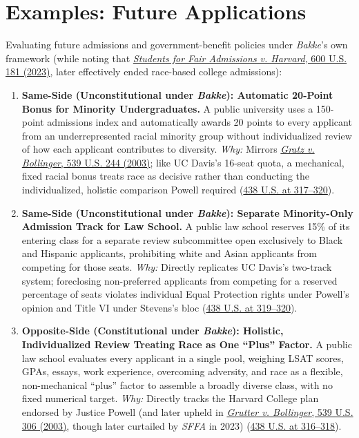 \documentclass[12pt]{article}
\begin{document}
\section{Examples: Future Applications}
Evaluating future admissions and government-benefit policies under \textit{Bakke}'s own framework (while noting that \href{https://en.wikipedia.org/wiki/Students_for_Fair_Admissions_v._Harvard}{\textit{Students for Fair Admissions v. Harvard}, 600 U.S. 181 (2023)}, later effectively ended race-based college admissions):

\begin{enumerate}
\item \textbf{Same-Side (Unconstitutional under \textit{Bakke}): Automatic 20-Point Bonus for Minority Undergraduates.} A public university uses a 150-point admissions index and automatically awards 20 points to every applicant from an underrepresented racial minority group without individualized review of how each applicant contributes to diversity. \textit{Why:} Mirrors \href{https://supreme.justia.com/cases/federal/us/539/244/}{\textit{Gratz v. Bollinger}, 539 U.S. 244 (2003)}; like UC Davis's 16-seat quota, a mechanical, fixed racial bonus treats race as decisive rather than conducting the individualized, holistic comparison Powell required (\href{https://supreme.justia.com/cases/federal/us/438/265/}{438 U.S. at 317--320}).

\item \textbf{Same-Side (Unconstitutional under \textit{Bakke}): Separate Minority-Only Admission Track for Law School.} A public law school reserves 15\% of its entering class for a separate review subcommittee open exclusively to Black and Hispanic applicants, prohibiting white and Asian applicants from competing for those seats. \textit{Why:} Directly replicates UC Davis's two-track system; foreclosing non-preferred applicants from competing for a reserved percentage of seats violates individual Equal Protection rights under Powell's opinion and Title VI under Stevens's bloc (\href{https://supreme.justia.com/cases/federal/us/438/265/}{438 U.S. at 319--320}).

\item \textbf{Opposite-Side (Constitutional under \textit{Bakke}): Holistic, Individualized Review Treating Race as One ``Plus'' Factor.} A public law school evaluates every applicant in a single pool, weighing LSAT scores, GPAs, essays, work experience, overcoming adversity, and race as a flexible, non-mechanical ``plus'' factor to assemble a broadly diverse class, with no fixed numerical target. \textit{Why:} Directly tracks the Harvard College plan endorsed by Justice Powell (and later upheld in \href{https://en.wikipedia.org/wiki/Grutter_v._Bollinger}{\textit{Grutter v. Bollinger}, 539 U.S. 306 (2003)}, though later curtailed by \textit{SFFA} in 2023) (\href{https://supreme.justia.com/cases/federal/us/438/265/}{438 U.S. at 316--318}).


\end{enumerate}
\end{document}

